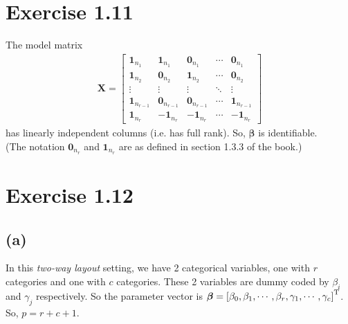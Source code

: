 \documentclass[a4paper]{article}
\begin{document}
\section{Exercise 1.11}
The model matrix
\begin{align*}
\bm{X} = 
\begin{bmatrix}
\bm{1}_{n_{1}} & \bm{1}_{n_{1}} & \bm{0}_{n_{1}} & \cdots & \bm{0}_{n_{1}}\\
\bm{1}_{n_{2}} & \bm{0}_{n_{2}} & \bm{1}_{n_{2}} & \cdots & \bm{0}_{n_{2}}\\
\vdots & \vdots & \vdots & \ddots & \vdots\\
\bm{1}_{n_{r-1}} & \bm{0}_{n_{r-1}} & \bm{0}_{n_{r-1}} & \cdots & \bm{1}_{n_{r-1}}\\
\bm{1}_{n_{r}} & -\bm{1}_{n_{r}} & -\bm{1}_{n_{r}} & \cdots & -\bm{1}_{n_{r}}
\end{bmatrix}
\end{align*}
has linearly independent columns (i.e. has full rank). So, $\bm{\beta}$ is identifiable.\\
(The notation $\bm{0}_{n_{r}}$ and $\bm{1}_{n_{r}}$ are as defined in section 1.3.3 of the book.)


\vspace{\baselineskip}
\section{Exercise 1.12}
\subsection{(a)}
In this \textit{two-way layout} setting, we have 2 categorical variables, one with $r$ categories and one with $c$ categories. These 2 variables are dummy coded by $\beta_{i}$ and $\gamma_{j}$ respectively. So the parameter vector is $\bm{\beta} = \left[\beta_{0}, \beta_{1}, \cdots, \beta_{r}, \gamma_{1}, \cdots, \gamma_{c} \right]^{\rm T}$. So, $p = r+c+1$.
\end{document}

